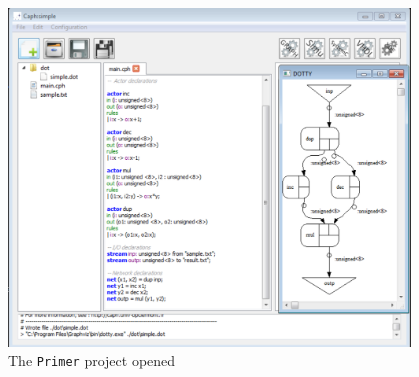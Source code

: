 \begin{figure}[h]
  \centering
  \includegraphics[width=0.95\textwidth]{figs/ide/opened-project}
  \caption{The \texttt{Primer} project opened}
  \label{fig:opened-primer-proj}
\end{figure}

